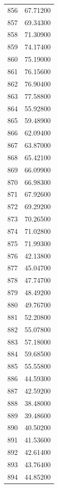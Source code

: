 \documentclass[
  letterpaper,
  DIV=11,
  numbers=noendperiod]{scrreprt}
\begin{document}
\begin{tcolorbox}
\begin{tabular}{lr}
856  &         67.71200 \\
857  &         69.34300 \\
858  &         71.30900 \\
859  &         74.17400 \\
860  &         75.19000 \\
861  &         76.15600 \\
862  &         76.90400 \\
863  &         77.58800 \\
864  &         55.92800 \\
865  &         59.48900 \\
866  &         62.09400 \\
867  &         63.87000 \\
868  &         65.42100 \\
869  &         66.09900 \\
870  &         66.98300 \\
871  &         67.92600 \\
872  &         69.29200 \\
873  &         70.26500 \\
874  &         71.02800 \\
875  &         71.99300 \\
876  &         42.13800 \\
877  &         45.04700 \\
878  &         47.74700 \\
879  &         48.49200 \\
880  &         49.76700 \\
881  &         52.20800 \\
882  &         55.07800 \\
883  &         57.18000 \\
884  &         59.68500 \\
885  &         55.55800 \\
886  &         44.59300 \\
887  &         42.59200 \\
888  &         38.48000 \\
889  &         39.48600 \\
890  &         40.50200 \\
891  &         41.53600 \\
892  &         42.61400 \\
893  &         43.76400 \\
894  &         44.85200 \\

\end{tabular}
\end{tcolorbox}
\end{document}
